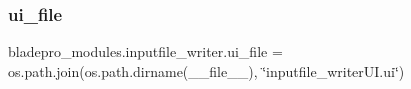 \hypertarget{namespacebladepro__modules_1_1inputfile__writer_a1b76e57504b8ccc9af88c21882fd995f}{}\label{namespacebladepro__modules_1_1inputfile__writer_a1b76e57504b8ccc9af88c21882fd995f} 
\subsubsection{\texorpdfstring{ui\+\_\+file}{ui\_file}}
{\footnotesize\ttfamily bladepro\+\_\+modules.\+inputfile\+\_\+writer.\+ui\+\_\+file = os.\+path.\+join(os.\+path.\+dirname(\+\_\+\+\_\+file\+\_\+\+\_\+), \char`\"{}inputfile\+\_\+writer\+U\+I.\+ui\char`\"{})}


